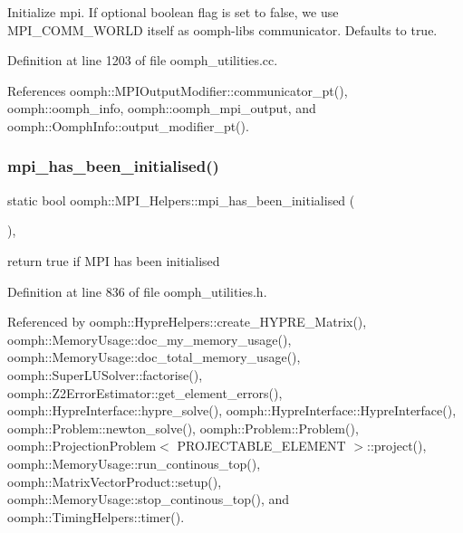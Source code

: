 Initialize mpi. If optional boolean flag is set to false, we use M\+P\+I\+\_\+\+C\+O\+M\+M\+\_\+\+W\+O\+R\+LD itself as oomph-\/lib\textquotesingle{}s communicator. Defaults to true. 

Definition at line 1203 of file oomph\+\_\+utilities.\+cc.



References oomph\+::\+M\+P\+I\+Output\+Modifier\+::communicator\+\_\+pt(), oomph\+::oomph\+\_\+info, oomph\+::oomph\+\_\+mpi\+\_\+output, and oomph\+::\+Oomph\+Info\+::output\+\_\+modifier\+\_\+pt().

\mbox{\label{classoomph_1_1MPI__Helpers_aa376d403f6bc99e8595d227135932b0e}} 
\subsubsection{\texorpdfstring{mpi\+\_\+has\+\_\+been\+\_\+initialised()}{mpi\_has\_been\_initialised()}}
{\footnotesize\ttfamily static bool oomph\+::\+M\+P\+I\+\_\+\+Helpers\+::mpi\+\_\+has\+\_\+been\+\_\+initialised (\begin{DoxyParamCaption}{ }\end{DoxyParamCaption})\hspace{0.3cm}{\ttfamily [inline]}, {\ttfamily [static]}}



return true if M\+PI has been initialised 



Definition at line 836 of file oomph\+\_\+utilities.\+h.



Referenced by oomph\+::\+Hypre\+Helpers\+::create\+\_\+\+H\+Y\+P\+R\+E\+\_\+\+Matrix(), oomph\+::\+Memory\+Usage\+::doc\+\_\+my\+\_\+memory\+\_\+usage(), oomph\+::\+Memory\+Usage\+::doc\+\_\+total\+\_\+memory\+\_\+usage(), oomph\+::\+Super\+L\+U\+Solver\+::factorise(), oomph\+::\+Z2\+Error\+Estimator\+::get\+\_\+element\+\_\+errors(), oomph\+::\+Hypre\+Interface\+::hypre\+\_\+solve(), oomph\+::\+Hypre\+Interface\+::\+Hypre\+Interface(), oomph\+::\+Problem\+::newton\+\_\+solve(), oomph\+::\+Problem\+::\+Problem(), oomph\+::\+Projection\+Problem$<$ P\+R\+O\+J\+E\+C\+T\+A\+B\+L\+E\+\_\+\+E\+L\+E\+M\+E\+N\+T $>$\+::project(), oomph\+::\+Memory\+Usage\+::run\+\_\+continous\+\_\+top(), oomph\+::\+Matrix\+Vector\+Product\+::setup(), oomph\+::\+Memory\+Usage\+::stop\+\_\+continous\+\_\+top(), and oomph\+::\+Timing\+Helpers\+::timer().



